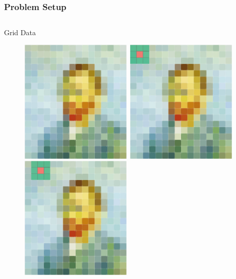 \documentclass[aspectratio=169]{beamer}
\begin{document}
\begin{frame}[t]
    \frametitle{Problem Setup}
    \begin{columns} %
        \begin{column}{.48\textwidth}
            \begin{minipage}[c][.9\textheight][c]{.98\textwidth}
                \begin{center}
                    \vskip0.25cm
                    Grid Data
                    \vskip0.05cm
                    \begin{figure}
                        \begin{overprint}
                            \centering \includegraphics[width=5.4cm, height=6cm]{img/van_gogh.jpg}
                            \centering \includegraphics[width=5.4cm, height=6cm]{img/van_gogh_1.jpg}
                            \centering \includegraphics[width=5.4cm, height=6cm]{img/van_gogh_2.jpg}

\end{overprint}
\end{figure}
\end{center}
\end{minipage}
\end{column}
\end{columns}
\end{frame}
\end{document}
